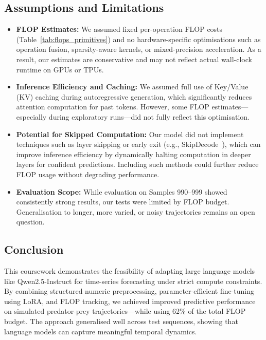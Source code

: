 \documentclass[a4paper,12pt]{article}
\begin{document}
  
  \subsection*{Assumptions and Limitations}
  
  \begin{itemize}
    \item \textbf{FLOP Estimates:} We assumed fixed per-operation FLOP costs (Table~\ref{tab:flops_primitives}) and no hardware-specific optimisations such as operation fusion, sparsity-aware kernels, or mixed-precision acceleration. As a result, our estimates are conservative and may not reflect actual wall-clock runtime on GPUs or TPUs.
  
    \item \textbf{Inference Efficiency and Caching:} We assumed full use of Key/Value (KV) caching during autoregressive generation, which significantly reduces attention computation for past tokens. However, some FLOP estimates—especially during exploratory runs—did not fully reflect this optimisation.
  
    \item \textbf{Potential for Skipped Computation:} Our model did not implement techniques such as layer skipping or early exit (e.g., SkipDecode~\cite{delcorro2023skipdecode}), which can improve inference efficiency by dynamically halting computation in deeper layers for confident predictions. Including such methods could further reduce FLOP usage without degrading performance.
  
    \item \textbf{Evaluation Scope:} While evaluation on Samples 990–999 showed consistently strong results, our tests were limited by FLOP budget. Generalisation to longer, more varied, or noisy trajectories remains an open question.
  \end{itemize}
  
  
  \subsection*{Conclusion}

  This coursework demonstrates the feasibility of adapting large language models like Qwen2.5-Instruct for time-series forecasting under strict compute constraints. By combining structured numeric preprocessing, parameter-efficient fine-tuning using LoRA, and FLOP tracking, we achieved improved predictive performance on simulated predator-prey trajectories—while using 62\% of the total FLOP budget. The approach generalised well across test sequences, showing that language models can capture meaningful temporal dynamics.
  
\end{document}
